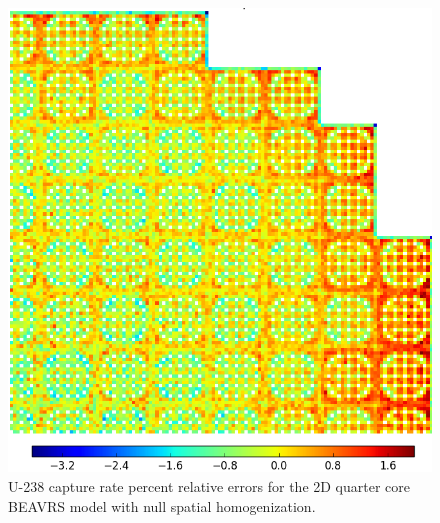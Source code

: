 \begin{figure}[h!]
\centering
\includegraphics[width=\linewidth]{figures/patterns/lns/full-core/capt-err-null}
\vspace{2mm}
\caption[U-238 capture rate errors for \ac{BEAVRS} with null homogenization]{U-238 capture rate percent relative errors for the 2D quarter core \ac{BEAVRS} model with null spatial homogenization.}
\label{fig:chap9-full-core-capt-err-null}
\end{figure}

\clearpage

